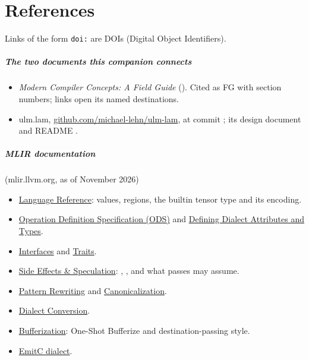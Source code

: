 \chapter*{References}

Links of the form \texttt{doi:} are DOIs (Digital Object Identifiers).

\paragraph{The two documents this companion connects}
\begin{itemize}
\item \emph{Modern Compiler Concepts: A Field Guide} (\texttt{\FGfile}).
  Cited as FG with section numbers; links open its named destinations.
\item ulm.lam, \href{\repo}{github.com/michael-lehn/ulm-lam}, at commit
  \texttt{\shortcommit}; its design document
   and README .
\end{itemize}

\paragraph{MLIR documentation} (mlir.llvm.org, as of November 2026)
\begin{itemize}
\item \href{https://mlir.llvm.org/docs/LangRef/}{Language Reference}: values,
  regions, the builtin tensor type and its encoding.
\item \href{https://mlir.llvm.org/docs/DefiningDialects/Operations/}{Operation
  Definition Specification (ODS)} and
  \href{https://mlir.llvm.org/docs/DefiningDialects/AttributesAndTypes/}{Defining
  Dialect Attributes and Types}.
\item \href{https://mlir.llvm.org/docs/Interfaces/}{Interfaces} and
  \href{https://mlir.llvm.org/docs/Traits/}{Traits}.
\item \href{https://mlir.llvm.org/docs/Rationale/SideEffectsAndSpeculation/}{Side
  Effects \& Speculation}: , , and what
  passes may assume.
\item \href{https://mlir.llvm.org/docs/PatternRewriter/}{Pattern Rewriting}
  and \href{https://mlir.llvm.org/docs/Canonicalization/}{Canonicalization}.
\item \href{https://mlir.llvm.org/docs/DialectConversion/}{Dialect Conversion}.
\item \href{https://mlir.llvm.org/docs/Bufferization/}{Bufferization}:
  One-Shot Bufferize and destination-passing style.
\item \href{https://mlir.llvm.org/docs/Dialects/EmitC/}{EmitC dialect}.
\end{itemize}

